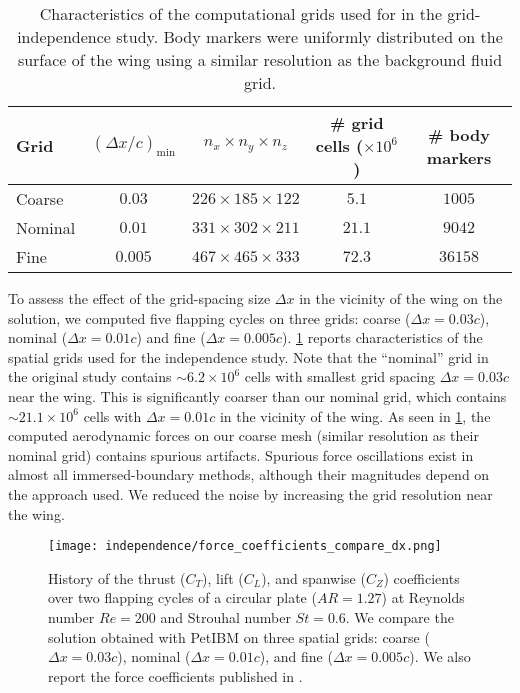\begin{table}[!h]
  \centering
  \begin{tabular}{lcccc}
    \hline\hline
    Grid & $(\Delta x / c)_\text{min}$ & $n_x \times n_y \times n_z$ & \# grid cells ($\times 10^6$) & \# body markers \\
    \hline
    Coarse & $0.03$ & $226 \times 185 \times 122$ & $5.1$ & $1005$ \\
    Nominal & $0.01$ & $331 \times 302 \times 211$ & $21.1$ & $9042$ \\
    Fine & $0.005$ & $467 \times 465 \times 333$ & $72.3$ & $36158$ \\
    \hline\hline
  \end{tabular}
  \caption{Characteristics of the computational grids used for in the grid-independence study. Body markers were uniformly distributed on the surface of the wing using a similar resolution as the background fluid grid.}
  \label{tab:independence_grid_charateristics}
\end{table}

To assess the effect of the grid-spacing size $\Delta x$ in the vicinity of the wing on the solution, we computed five flapping cycles on three grids: coarse ($\Delta x = 0.03c$), nominal ($\Delta x = 0.01c$) and fine ($\Delta x = 0.005c$).
\cref{tab:independence_grid_charateristics} reports characteristics of the spatial grids used for the independence study.
Note that the ``nominal'' grid in the original study contains $\sim 6.2 \times 10^6$ cells with smallest grid spacing $\Delta x = 0.03c$ near the wing.
This is significantly coarser than our nominal grid, which contains $\sim 21.1 \times 10^6$ cells with $\Delta x = 0.01c$ in the vicinity of the wing.
As seen in \cref{fig:independence_force_coefficients_dx}, the computed aerodynamic forces on our coarse mesh (similar resolution as their nominal grid) contains spurious artifacts.
Spurious force oscillations exist in almost all immersed-boundary methods, although their magnitudes depend on the approach used.
We reduced the noise by increasing the grid resolution near the wing.

\begin{figure}[!h]
  \centering
  \texttt{[image: independence/force\_coefficients\_compare\_dx.png]}
  \caption{History of the thrust ($C_T$), lift ($C_L$), and spanwise ($C_Z$) coefficients over two flapping cycles of a circular plate ($AR = 1.27$) at Reynolds number $Re = 200$ and Strouhal number $St = 0.6$. We compare the solution obtained with PetIBM on three spatial grids: coarse ($\Delta x = 0.03c$), nominal ($\Delta x = 0.01c$), and fine ($\Delta x = 0.005c$). We also report the force coefficients published in \citet{li_dong_2016}.}
  \label{fig:independence_force_coefficients_dx}
\end{figure}

